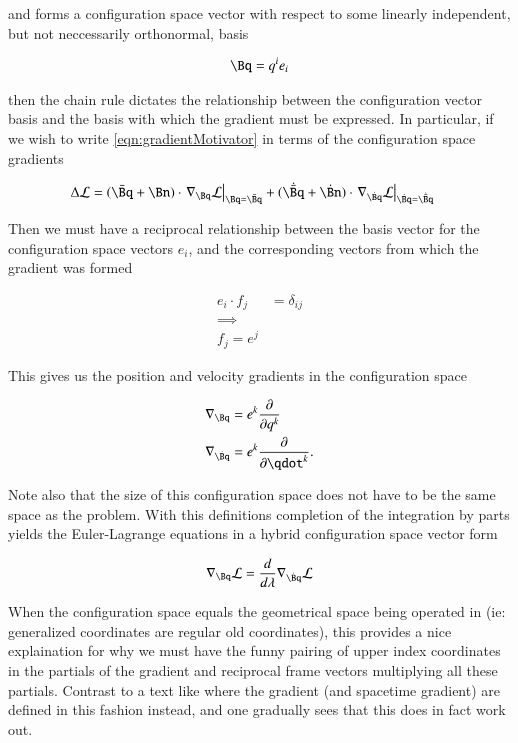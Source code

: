 \documentclass{article}
\begin{document}
and forms a configuration space vector with respect to some linearly independent, but not neccessarily orthonormal, basis

\begin{align*}
\Bq = q^i e_i
\end{align*}

then the chain rule dictates the relationship between the configuration vector basis and the basis with which the gradient must be expressed.  In
particular, if we wish to write \ref{eqn:gradientMotivator} in terms of the configuration space gradients

\begin{align*}
\Delta \LL &=
(\bar{\Bq} + \Bn) \cdot \left.\grad_\Bq \LL \right\vert_{\Bq = \bar{\Bq}}
+ (\dot{\bar{\Bq}} + \dot{\Bn}) \cdot \left.\grad_{\dot{\Bq}} \LL \right\vert_{\dot{\Bq} = \dot{\bar{\Bq}}}
\end{align*}

Then we must have a reciprocal relationship between the basis vector for the configuration space vectors $e_i$, and the corresponding vectors
from which the gradient was formed

\begin{align*}
e_i \cdot f_j &= \delta_{i j} \\
\implies \\
f_j = e^j
\end{align*}

This gives us the position and velocity gradients in the configuration space

\begin{align}
\grad_{\Bq} &= e^k \PD{q^k}{} \\
\grad_{\dot{\Bq}} &= e^k \PD{\qdot^k}{}.
\end{align}

Note also that the size of this configuration space does not have to be the same space as the problem.  With this definitions completion of the integration
by parts yields the Euler-Lagrange equations in a hybrid configuration space vector form

\begin{align}
\grad_{\Bq} \LL = \frac{d}{d\lambda} \grad_{\dot{\Bq}} \LL
\end{align}

When the configuration space equals the geometrical space being operated in (ie: generalized coordinates are regular old coordinates), this 
provides a nice explaination for why we must have the funny pairing of upper index coordinates in the partials of the gradient and reciprocal frame
vectors multiplying all these partials.  Contrast to a text like \cite{doran2003gap} where the gradient (and spacetime gradient) are defined in this
fashion instead, and one gradually sees that this does in fact work out.
\end{document}
